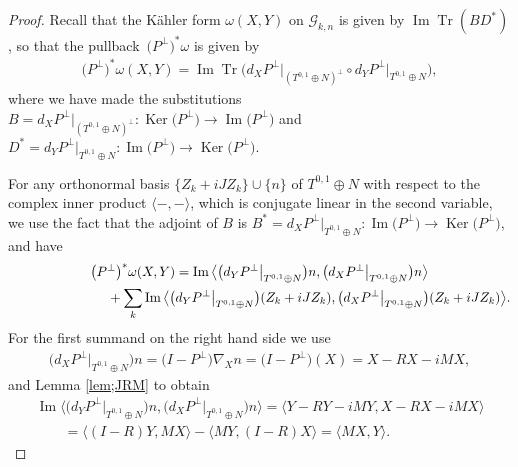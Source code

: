 \documentclass[pdftex]{sigma}
\DeclareMathOperator{\Tr}{Tr}
\numberwithin{equation}{section}
\newcommand{\cG}{{\mathcal G}}
\begin{document}
\begin{proof}
Recall that the K\"ahler form $\omega(X,Y)$ on $\cG_{k,n}$ is given by $\operatorname{Im} \Tr(BD^*)$, so that the pull\-back~$\big(P^\perp\big)^*\omega$ is given by
\begin{gather*}
\big(P^\perp\big)^*\omega(X,Y)= \operatorname{Im} \Tr \big( d_X P^\perp\big|_{(T^{0,1} \oplus N)^\perp} \circ d_Y P^\perp \big|_{T^{0,1}\oplus N} \big),
\end{gather*}
where we have made the substitutions $B= d_X P^\perp\big|_{(T^{0,1}\oplus N)^\perp}\colon \operatorname{Ker}\big(P^\perp\big) \to \operatorname{Im}\big(P^\perp\big)$ and $D^* = d_Y P^\perp\big|_{T^{0,1} \oplus N} \colon \operatorname{Im}\big(P^\perp\big) \to \operatorname{Ker}\big(P^\perp\big)$.

For any orthonormal basis $\{Z_k + i J Z_k\} \cup \{n\}$ of $T^{0,1} \oplus N$ with respect to the complex inner product $\langle - ,- \rangle$, which is conjugate linear in the second variable, we use the fact that the adjoint of $B$ is $B^* = d_X P^\perp\big|_{T^{0,1} \oplus N} \colon \operatorname{Im}\big(P^\perp\big) \to \operatorname{Ker}\big(P^\perp\big)$, and have
\begin{gather*}
\big(P^\perp\big)^*\omega(X,Y) = \operatorname{Im} \big\langle \big( d_Y P^\perp\big|_{T^{0,1}\oplus N} \big) n, \big( d_X P^\perp\big|_{T^{0,1} \oplus N} \big) n \big\rangle\\
\hphantom{\big(P^\perp\big)^*\omega(X,Y) =}{} + \sum _k \operatorname{Im} \big\langle \big( d_Y P^\perp\big|_{T^{0,1} \oplus N} \big) (Z_k + i J Z_k), \big( d_X P^\perp\big|_{T^{0,1}\oplus N} \big) (Z_k + i J Z_k) \big\rangle.
\end{gather*}
For the first summand on the right hand side we use
\begin{gather*}
\big( d_X P^\perp\big|_{T^{0,1} \oplus N } \big) n = \big(I-P^\perp\big) \nabla_X n = \big(I-P^\perp\big)(X) = X - RX - iMX,
\end{gather*}
and Lemma \ref{lem;JRM} to obtain
\begin{gather*}
\operatorname{Im} \big\langle \big( d_Y P^\perp\big|_{T^{0,1}\oplus N} \big) n, \big( d_X P^\perp\big|_{T^{0,1}\oplus N} \big) n \big\rangle
 = \langle Y - RY - iMY, X - RX - iMX \rangle \\
 \qquad{} = \langle (I-R)Y ,MX \rangle - \langle MY, (I-R)X\rangle = \langle MX, Y \rangle.
\end{gather*}


\end{proof}
\end{document}
